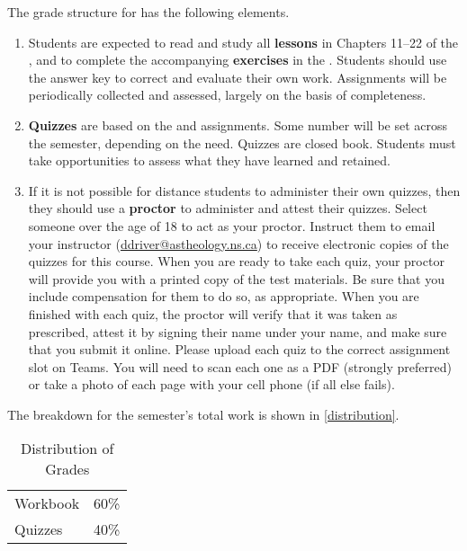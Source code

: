 \documentclass[titlepage]{article}
\begin{document}
The grade structure for \ccode has the following elements.

\begin{enumerate}
 \item
    Students are expected to read and study all \textbf{lessons} in
    Chapters 11–22 of the \cite{lbh}, and to complete the accompanying
    \textbf{exercises} in the \cite{work}. Students should use the
    answer key to correct and evaluate their own work. Assignments will
    be periodically collected and assessed, largely on the basis of
    completeness.
 \item
    \textbf{Quizzes} are based on the \cite{lbh} and \cite{work}
    assignments. Some number will be set across the semester, depending
    on the need. Quizzes are closed book. Students must take
    opportunities to assess what they have learned and retained.
 \item
    If it is not possible for distance students to administer their own
    quizzes, then they should use a \textbf{proctor} to administer and
    attest their quizzes. Select someone over the age of 18 to act as
    your proctor. Instruct them to email your instructor
    (\href{mailto:ddriver@astheology.ns.ca}{ddriver@astheology.ns.ca})
    to receive electronic copies of the quizzes for this course. When
    you are ready to take each quiz, your proctor will provide you with
    a printed copy of the test materials. Be sure that you include
    compensation for them to do so, as appropriate. When you are
    finished with each quiz, the proctor will verify that it was taken
    as prescribed, attest it by signing their name under your name, and
    make sure that you submit it online. Please upload each quiz to the
    correct assignment slot on Teams. You will need to scan each one as
    a PDF (strongly preferred) or take a photo of each page with your
    cell phone (if all else fails).
\end{enumerate}

The breakdown for the semester's total work is shown in
\autoref{distribution}.

\begin{table}[htbp]
  \centering
  {\lining
  \begin{tabular}{lr}
    \toprule
    Workbook & 60\% \\
    Quizzes  & 40\% \\
    \bottomrule
  \end{tabular}}
  \caption{Distribution of Grades}
  \label{distribution}
\end{table}
\end{document}
